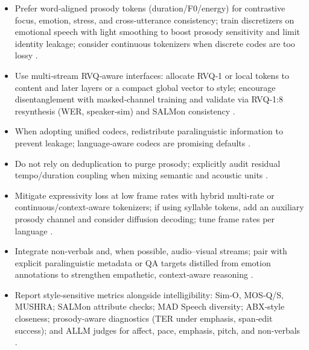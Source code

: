 \begin{itemize}
\item Prefer word‑aligned prosody tokens (duration/F0/energy) for contrastive focus, emotion, stress, and cross‑utterance consistency; train discretizers on emotional speech with light smoothing to boost prosody sensitivity and limit identity leakage; consider continuous tokenizers when discrete codes are too lossy \cite{qian2025prosodylmuncoveringemergingprosodyproces,onda2025benchmarkingprosodyencodingdiscretespeec,li2025continuousspeechtokenizertext}.
\item Use multi‑stream RVQ‑aware interfaces: allocate RVQ‑1 or local tokens to content and later layers or a compact global vector to style; encourage disentanglement with masked‑channel training and validate via RVQ‑1:8 resynthesis (WER, speaker‑sim) and SALMon consistency \cite{ji2025languagecodecbridgingdiscreterepresentat,maimon2025salmonsuiteacousticlanguagemodelevaluati,entry2025indicsuperbspeechprocessinguniversalperf}.
\item When adopting unified codecs, redistribute paralinguistic information to prevent leakage; language‑aware codecs are promising defaults \cite{ji2025languagecodecbridgingdiscreterepresentat}.
\item Do not rely on deduplication to purge prosody; explicitly audit residual tempo/duration coupling when mixing semantic and acoustic units \cite{peng2024empiricalstudyspeechlanguagemodelsprompt}.
\item Mitigate expressivity loss at low frame rates with hybrid multi‑rate or continuous/context‑aware tokenizers; if using syllable tokens, add an auxiliary prosody channel and consider diffusion decoding; tune frame rates per language \cite{li2025continuousspeechtokenizertext,qian2025prosodylmuncoveringemergingprosodyproces,zhang2025impactframeratesspeechtokenizercasestudy,yang2025almtokenizerlowbitratesemanticrichaudioc,yang2025diffsoundstreamefficientspeechtokenizati}.
\item Integrate non‑verbals and, when possible, audio–visual streams; pair with explicit paralinguistic metadata or QA targets distilled from emotion annotations to strengthen empathetic, context‑aware reasoning \cite{har-tuv2025pastphoneticacousticspeechtokenizer,wang2025bossbeyondsemanticspeech,wang2025incorporatingcontextualparalinguisticund,mousavi2024howshouldweextractdiscreteaudiotokenssel}.
\item Report style‑sensitive metrics alongside intelligibility: Sim‑O, MOS‑Q/S, MUSHRA; SALMon attribute checks; MAD Speech diversity; ABX‑style closeness; prosody‑aware diagnostics (TER under emphasis, span‑edit success); and ALLM judges for affect, pace, emphasis, pitch, and non‑verbals \cite{maimon2025salmonsuiteacousticlanguagemodelevaluati,futeral2025madspeechmeasuresacousticdiversity,fily2024establishingdegreesclosenessbetweenaudio,chiang2025audioawarelargelanguagemodelsasjudgesspe}.
\end{itemize}

